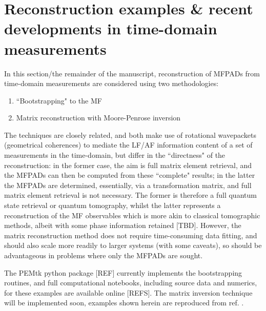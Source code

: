 \section{Reconstruction examples \& recent developments in time-domain measurements}

In this section/the remainder of the manuscript, reconstruction of MFPADs from time-domain measurements are considered using two methodologies:

\begin{enumerate}
\item ``Bootstrapping" to the MF \cite{hockett2018QMP1,hockett2018QMP2,marceau2017MolecularFrameReconstruction}
\item Matrix reconstruction with Moore-Penrose inversion \cite{gregory2021MolecularFramePhotoelectron}
\end{enumerate}

The techniques are closely related, and both make use of rotational wavepackets (geometrical coherences) to mediate the LF/AF information content of a set of measurements in the time-domain, but differ in the ``directness" of the reconstruction: in the former case, the aim is full matrix element retrieval, and the MFPADs can then be computed from these ``complete" results; in the latter the MFPADs are determined, essentially, via a transformation matrix, and full matrix element retrieval is not necessary. The former is therefore a full quantum state retrieval or quantum tomography, whilst the latter represents a reconstruction of the MF observables which is more akin to classical tomographic methods, albeit with some phase information retained [TBD]. However, the matrix reconstruction method does not require time-consuming data fitting, and should also scale more readily to larger systems (with some caveats), so should be advantageous in problems where only the MFPADs are sought.


The PEMtk python package [REF] currently implements the bootstrapping routines, and full computational notebooks, including source data and numerics, for these examples are available online [REFS]. The matrix inversion technique will be implemented soon, examples shown herein are reproduced from ref. \cite{gregory2021MolecularFramePhotoelectron}.